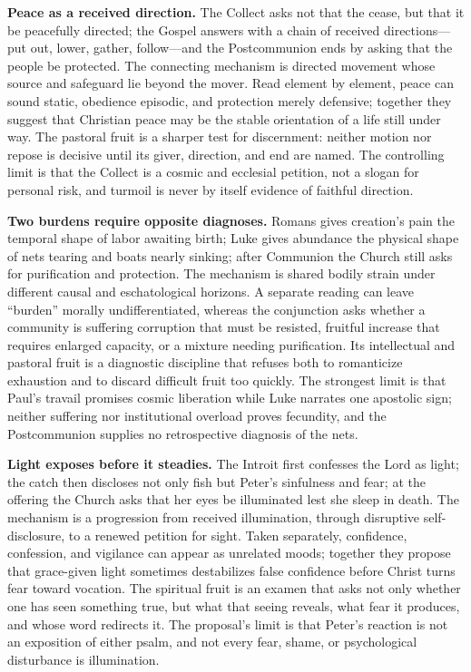 \noindent\textbf{Peace as a received direction.\enspace{}}
The Collect asks not that the  cease, but that it be peacefully directed; the Gospel answers with a chain of received directions---put out, lower, gather, follow---and the Postcommunion ends by asking that the people be protected. The connecting mechanism is directed movement whose source and safeguard lie beyond the mover. Read element by element, peace can sound static, obedience episodic, and protection merely defensive; together they suggest that Christian peace may be the stable orientation of a life still under way. The pastoral fruit is a sharper test for discernment: neither motion nor repose is decisive until its giver, direction, and end are named. The controlling limit is that the Collect is a cosmic and ecclesial petition, not a slogan for personal risk, and turmoil is never by itself evidence of faithful direction.

\noindent\textbf{Two burdens require opposite diagnoses.\enspace{}}
Romans gives creation's pain the temporal shape of labor awaiting birth; Luke gives abundance the physical shape of nets tearing and boats nearly sinking; after Communion the Church still asks for purification and protection. The mechanism is shared bodily strain under different causal and eschatological horizons. A separate reading can leave ``burden'' morally undifferentiated, whereas the conjunction asks whether a community is suffering corruption that must be resisted, fruitful increase that requires enlarged capacity, or a mixture needing purification. Its intellectual and pastoral fruit is a diagnostic discipline that refuses both to romanticize exhaustion and to discard difficult fruit too quickly. The strongest limit is that Paul's travail promises cosmic liberation while Luke narrates one apostolic sign; neither suffering nor institutional overload proves fecundity, and the Postcommunion supplies no retrospective diagnosis of the nets.

\noindent\textbf{Light exposes before it steadies.\enspace{}}
The Introit first confesses the Lord as light; the catch then discloses not only fish but Peter's sinfulness and fear; at the offering the Church asks that her eyes be illuminated lest she sleep in death. The mechanism is a progression from received illumination, through disruptive self-disclosure, to a renewed petition for sight. Taken separately, confidence, confession, and vigilance can appear as unrelated moods; together they propose that grace-given light sometimes destabilizes false confidence before Christ turns fear toward vocation. The spiritual fruit is an examen that asks not only whether one has seen something true, but what that seeing reveals, what fear it produces, and whose word redirects it. The proposal's limit is that Peter's reaction is not an exposition of either psalm, and not every fear, shame, or psychological disturbance is illumination.

